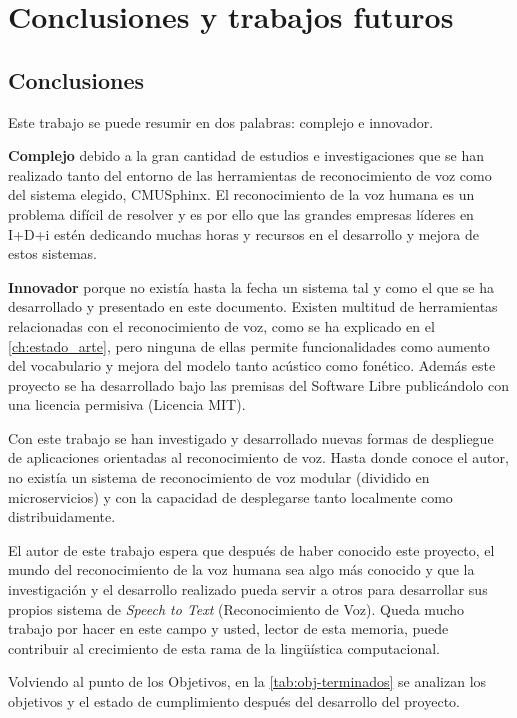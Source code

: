 \documentclass[../main.tex]{subfiles}
\begin{document}
\chapter{Conclusiones y trabajos futuros}\label{ch:conclusiones}
\section{Conclusiones}\label{sec:conclusiones}
Este trabajo se puede resumir en dos palabras: complejo e innovador.

\textbf{Complejo} debido a la gran cantidad de estudios e investigaciones que se han realizado tanto del entorno de las herramientas de reconocimiento de voz como del sistema elegido, CMUSphinx. El reconocimiento de la voz humana es un problema difícil de resolver y es por ello que las grandes empresas líderes en I+D+i estén dedicando muchas horas y recursos en el desarrollo y mejora de estos sistemas.

\textbf{Innovador} porque no existía hasta la fecha un sistema tal y como el que se ha desarrollado y presentado en este documento. Existen multitud de herramientas relacionadas con el reconocimiento de voz, como se ha explicado en el \autoref{ch:estado_arte}, pero ninguna de ellas permite funcionalidades como aumento del vocabulario y mejora del modelo tanto acústico como fonético. Además este proyecto se ha desarrollado bajo las premisas del Software Libre publicándolo con una licencia permisiva (Licencia MIT).

Con este trabajo se han investigado y desarrollado nuevas formas de despliegue de aplicaciones orientadas al reconocimiento de voz. Hasta donde conoce el autor, no existía un sistema de reconocimiento de voz modular (dividido en microservicios) y con la capacidad de desplegarse tanto localmente como distribuidamente.

El autor de este trabajo espera que después de haber conocido este proyecto, el mundo del reconocimiento de la voz humana sea algo más conocido y que la investigación y el desarrollo realizado pueda servir a otros para desarrollar sus propios sistema de \textit{Speech to Text} (Reconocimiento de Voz). Queda mucho trabajo por hacer en este campo y usted, lector de esta memoria, puede contribuir al crecimiento de esta rama de la lingüística computacional.

Volviendo al punto de los Objetivos, en la \autoref{tab:obj-terminados} se analizan los objetivos y el estado de cumplimiento después del desarrollo del proyecto.
\end{document}
